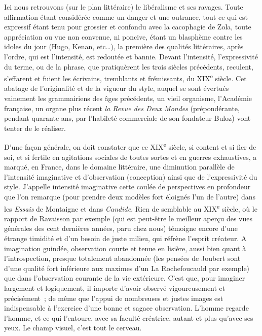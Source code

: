 \documentclass[french,twoside]{book} %
\begin{document}
Ici nous retrouvons (sur le plan littéraire) le libéralisme et ses ravages. Toute affirmation étant considérée comme un danger et une outrance, tout ce qui est expressif étant tenu pour grossier et confondu avec la cacophagie de Zola, toute appréciation ou vue non convenue, ni poncive, étant un blasphème contre les idoles du jour (Hugo, Kenan, etc…), la première des qualités littéraires, après l’ordre, qui est l’intensité, est redoutée et bannie. Devant l’intensité, l’expressivité du terme, ou de la phrase, que pratiquèrent les trois siècles précédents, reculent, s’effarent et fuient les écrivains, tremblants et frémissants, du XIX\textsuperscript{e} siècle. Cet abatage de l’originalité et de la vigueur du style, auquel se sont évertués vainement les grammairiens des âges précédents, un vieil organisme, l’Académie française, un organe plus récent {\itshape la Revue des Deux Mondes} (prépondérante, pendant quarante ans, par l’habileté commerciale de son fondateur Buloz) vont tenter de le réaliser.\par
D’une façon générale, on doit constater que ce XIX\textsuperscript{e} siècle, si content et si fier de soi, et si fertile en agitations sociales de toutes sortes et en guerres exhaustives, a marqué, en France, dans le domaine littéraire, une diminution parallèle de l’intensité imaginative et d’observation (conception) ainsi que de l’expressivité du style. J’appelle intensité imaginative cette coulée de perspectives en profondeur que l’on remarque (pour prendre deux modèles fort éloignés l’un de l’autre) dans les {\itshape Essais} de Montaigne et dans {\itshape Candide}. Rien de semblable au XIX\textsuperscript{e} siècle, où le rapport de Ravaisson par exemple (qui est peut-être le meilleur aperçu des vues générales des cent dernières années, paru chez nous) témoigne encore d’une étrange timidité et d’un besoin de juste milieu, qui réfrène l’esprit créateur. A imagination guindée, observation courte et tenue en lisière, aussi bien quant à l’introspection, presque totalement abandonnée (les pensées de Joubert sont d’une qualité fort inférieure aux maximes d’un La Rochefoucauld par exemple) que dans l’observation courante de la vie extérieure. C’est que, pour imaginer largement et logiquement, il importe d’avoir observé vigoureusement et précisément ; de même que l’appui de nombreuses et justes images est indispensable à l’exercice d’une bonne et sagace observation. L’homme regarde l’homme, et ce qui l’entoure, avec sa faculté créatrice, autant et plus qu’avec ses yeux. Le champ visuel, c’est tout le cerveau.\par
\end{document}
